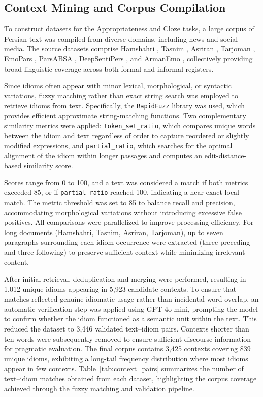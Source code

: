 \documentclass[11pt,a4paper]{article}
\begin{document}
\subsection{Context Mining and Corpus Compilation}
To construct datasets for the Appropriateness and Cloze tasks, a large corpus of Persian text was compiled from diverse domains, including news and social media. The source datasets comprise Hamshahri \cite{aleahmad2009hamshahri}, Tasnim \cite{pourmand2022tasnim}, Asriran \cite{pourmand2022asriran}, Tarjoman \cite{pourmand_tarjoman}, EmoPars \cite{sabri2021emopars}, ParsABSA \cite{ataei2019parsabsa}, DeepSentiPers \cite{sharami2020deepsentipers}, and ArmanEmo \cite{mirzaee2025armanemo}, collectively providing broad linguistic coverage across both formal and informal registers.

Since idioms often appear with minor lexical, morphological, or syntactic variations, fuzzy matching rather than exact string search was employed to retrieve idioms from text. Specifically, the \texttt{RapidFuzz} library \cite{rapidfuzz_token_set_ratio} was used, which provides efficient approximate string-matching functions. Two complementary similarity metrics were applied: \texttt{token\_set\_ratio}, which compares unique words between the idiom and text regardless of order to capture reordered or slightly modified expressions, and \texttt{partial\_ratio}, which searches for the optimal alignment of the idiom within longer passages and computes an edit-distance-based similarity score.

Scores range from 0 to 100, and a text was considered a match if both metrics exceeded 85, or if \texttt{partial\_ratio} reached 100, indicating a near-exact local match. The metric threshold was set to 85 to balance recall and precision, accommodating morphological variations without introducing excessive false positives. All comparisons were parallelized to improve processing efficiency. For long documents (Hamshahri, Tasnim, Asriran, Tarjoman), up to seven paragraphs surrounding each idiom occurrence were extracted (three preceding and three following) to preserve sufficient context while minimizing irrelevant content.

After initial retrieval, deduplication and merging were performed, resulting in 1,012 unique idioms appearing in 5,923 candidate contexts. To ensure that matches reflected genuine idiomatic usage rather than incidental word overlap, an automatic verification step was applied using GPT-4o-mini, prompting the model to confirm whether the idiom functioned as a semantic unit within the text. This reduced the dataset to 3,446 validated text–idiom pairs. Contexts shorter than ten words were subsequently removed to ensure sufficient discourse information for pragmatic evaluation. The final corpus contains 3,425 contexts covering 839 unique idioms, exhibiting a long-tail frequency distribution where most idioms appear in few contexts. 
Table~\ref{tab:context_pairs} summarizes the number of text–idiom matches obtained from each dataset, highlighting the corpus coverage achieved through the fuzzy matching and validation pipeline.
\end{document}
